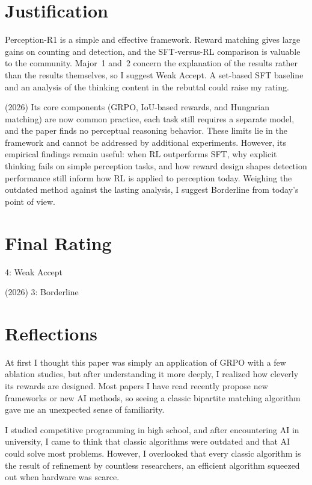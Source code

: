 \documentclass[10pt,twocolumn,letterpaper]{article}
\begin{document}
\section{Justification}
Perception-R1 is a simple and effective framework. Reward matching gives large gains on counting and detection, and the SFT-versus-RL comparison is valuable to the community. Major~1 and~2 concern the explanation of the results rather than the results themselves, so I suggest Weak Accept. A set-based SFT baseline and an analysis of the thinking content in the rebuttal could raise my rating.

(2026) Its core components (GRPO, IoU-based rewards, and Hungarian matching) are now common practice, each task still requires a separate model, and the paper finds no perceptual reasoning behavior. These limits lie in the framework and cannot be addressed by additional experiments. However, its empirical findings remain useful: when RL outperforms SFT, why explicit thinking fails on simple perception tasks, and how reward design shapes detection performance still inform how RL is applied to perception today. Weighing the outdated method against the lasting analysis, I suggest Borderline from today's point of view.

\section{Final Rating}
4: Weak Accept

(2026) 3: Borderline

\section{Reflections}
At first I thought this paper was simply an application of GRPO with a few ablation studies, but after understanding it more deeply, I realized how cleverly its rewards are designed. Most papers I have read recently propose new frameworks or new AI methods, so seeing a classic bipartite matching algorithm gave me an unexpected sense of familiarity.

I studied competitive programming in high school, and after encountering AI in university, I came to think that classic algorithms were outdated and that AI could solve most problems. However, I overlooked that every classic algorithm is the result of refinement by countless researchers, an efficient algorithm squeezed out when hardware was scarce.

{\small




}
\end{document}
